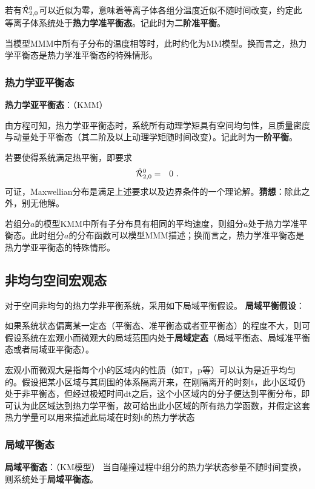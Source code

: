   若有$\hat{\mathcal{R}}_{2,0}^0$可以近似为零，意味着等离子体各组分温度近似不随时间改变，约定此等离子体系统处于\textbf{热力学准平衡态}。记此时为\textbf{二阶准平衡}。

  当模型MMM中所有子分布的温度相等时，此时约化为MM模型。换而言之，热力学平衡态是热力学准平衡态的特殊情形。 
  
  \subsubsection{热力学亚平衡态}
  \label{热力学亚平衡态}
  \textbf{热力学亚平衡态}：（KMM）
  
  由方程可知，热力学亚平衡态时，系统所有动理学矩具有空间均匀性，且质量密度与动量处于平衡态（其二阶及以上动理学矩随时间改变）。记此时为\textbf{一阶平衡}。
  
  
  若要使得系统满足热平衡，即要求
  \begin{eqnarray}
      \hat{\mathcal{R}}_{2,0}^0  &=&  0  ~.  \label{R202}
  \end{eqnarray}
  可证，Maxwellian分布是满足上述要求以及边界条件的一个理论解。\textbf{猜想}：除此之外，别无他解。
  
  若组分$a$的模型KMM中所有子分布具有相同的平均速度，则组分$a$处于热力学准平衡态。此时组分$a$的分布函数可以模型MMM描述；换而言之，热力学准平衡态是热力学亚平衡态的特殊情形。
  
  \subsection{非均匀空间宏观态}
  \label{非均匀空间宏观态}

  对于空间非均匀的热力学非平衡系统，采用如下局域平衡假设。
  \textbf{局域平衡假设}：
  \begin{assumption}
        如果系统状态偏离某一定态（平衡态、准平衡态或者亚平衡态）的程度不大，则可假设系统在宏观小而微观大的局域范围内处于\textbf{局域定态}（局域平衡态、局域准平衡态或者局域亚平衡态）。
  \end{assumption}

  宏观小而微观大是指每个小的区域内的性质（如T，p等）可以认为是近乎均匀的。假设把某小区域与其周围的体系隔离开来，在刚隔离开的时刻t，此小区域仍处于非平衡态，但经过极短时间dt之后，这个小区域内的分子便达到平衡分布，即可认为此区域达到热力学平衡，故可给出此小区域的所有热力学函数，并假定这套热力学量可以用来描述此局域在时刻t的热力学状态
  
  \subsubsection{局域平衡态}
  \label{局域平衡态}
  \textbf{局域平衡态}：（KM模型）
  当自碰撞过程中组分的热力学状态参量不随时间变换，则系统处于\textbf{局域平衡态}。
  
